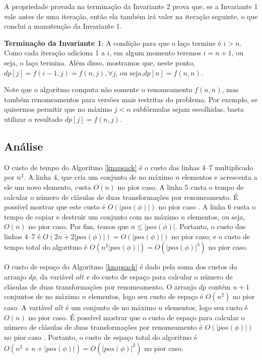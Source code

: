 A propriedade provada na terminação da Invariante 2 prova que, se a Invariante 1 vale antes de uma iteração, então ela também irá valer na iteração seguinte, o que conclui a manutenção da Invariante 1.

\textbf{Terminação da Invariante 1}: A condição para que o laço termine é $i > n$. Como cada iteração adiciona 1 a $i$, em algum momento teremos $i = n+1$, ou seja, o laço termina. Além disso, mostramos que, neste ponto, $dp[j] = f(i-1,j) = f(n,j), \forall j$, ou seja,\break $dp[n] = f(n,n)$.

Note que o algoritmo computa não somente o renomeamento $f(n,n)$, mas também renomeamentos para versões mais restritas do problema. Por exemplo, se quisermos permitir que no máximo $j < n$ subfórmulas sejam escolhidas, basta utilizar o resultado $dp[j] = f(n,j)$.

\subsection{Análise}

\indent

O custo de tempo do Algoritmo \ref{knapsack} é o custo das linhas 4--7 multiplicado por $n^2$. A linha 4, que cria um conjunto de no máximo $n$ elementos e acrescenta a ele um novo elemento, custa $O(n)$ no pior caso. A linha 5 custa o tempo de calcular o número de clásulas de duas transformações por renomeamento. É possível mostrar que este custo é $O(|pos(\phi)|)$ no pior caso \cite{nonnengart2001computing}. A linha 6 custa o tempo de copiar e destruir um conjunto com no máximo $n$ elementos, ou seja, $O(n)$ no pior caso. Por fim, temos que $n \leq |pos(\phi)|$. Portanto, o custo das linhas 4--7 é $O(2n + 2|pos(\phi)|) = O(|pos(\phi)|)$ no pior caso; e o custo de tempo total do algoritmo é $O(n^2 |pos(\phi)|) = O(|pos(\phi)|^3)$ no pior caso.

O custo de espaço do Algoritmo \ref{knapsack} é dado pela soma dos custos do arranjo $dp$, da variável $alt$ e do custo de espaço para calcular o número de clásulas de duas transformações por renomeamento. O arranjo $dp$ contém $n+1$ conjuntos de no máximo $n$ elementos, logo seu custo de espaço é $O(n^2)$ no pior caso. A variável $alt$ é um conjunto de no máximo $n$ elementos, logo seu custo é $O(n)$ no pior caso. É possível mostrar que o custo de espaço para calcular o número de clásulas de duas transformações por renomeamento é $O(|pos(\phi)|)$ no pior caso \cite{nonnengart2001computing}. Portanto, o custo de espaço total do algoritmo é\break $O(n^2 + n + |pos(\phi)|) = O(|pos(\phi)|^2)$ no pior caso.

